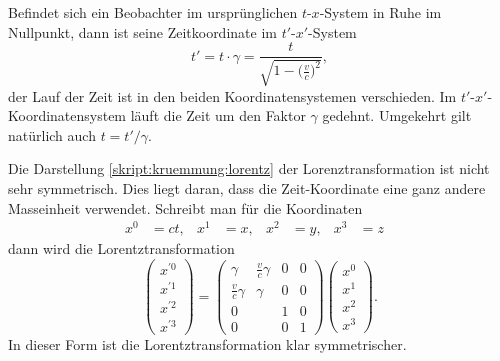 Befindet sich ein Beobachter im ursprünglichen $t$-$x$-System in Ruhe
im Nullpunkt, dann ist seine Zeitkoordinate im $t'$-$x'$-System
\begin{equation}
t'=t\cdot\gamma = \frac{t}{\displaystyle\sqrt{1-\biggl(\frac{v}{c}\biggr)^2}},
\label{skript:speziell:zeitdilatation}
\end{equation}
der Lauf der Zeit ist in den beiden Koordinatensystemen verschieden.
Im $t'$-$x'$-Koordinatensystem läuft die Zeit um den Faktor $\gamma$
gedehnt.
Umgekehrt gilt natürlich auch $t=t'/\gamma$.

Die Darstellung \eqref{skript:kruemmung:lorentz} der Lorenztransformation
ist nicht sehr symmetrisch.
Dies liegt daran, dass die Zeit-Koordinate eine ganz andere Masseinheit
verwendet.
Schreibt man für die Koordinaten 
\[
\begin{aligned}
x^0&=ct,&
x^1&=x,&
x^2&=y,&
x^3&=z&
\end{aligned}
\]
dann wird die Lorentztransformation
\begin{equation}
\begin{pmatrix}
x^{\prime0}\\
x^{\prime1}\\
x^{\prime2}\\
x^{\prime3}
\end{pmatrix}
=
\begin{pmatrix}
\displaystyle          \gamma &\displaystyle\frac{v}{c}\gamma& 0 & 0 \\
\displaystyle\frac{v}{c}\gamma&\displaystyle           \gamma& 0 & 0 \\
      0                       &                              & 1 & 0 \\
      0                       &                              & 0 & 1 
\end{pmatrix}
\begin{pmatrix}
x^0\\x^1\\x^2\\x^3
\end{pmatrix}.
\label{skript:speziell:4lorentz}
\end{equation}
In dieser Form ist die Lorentztransformation klar symmetrischer.

